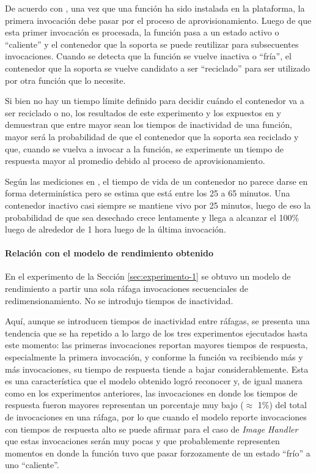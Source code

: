 De acuerdo con \cite{cold-starts-aws-lambda-1}, una vez que una función ha sido instalada en la plataforma, la primera invocación debe pasar por el proceso de aprovisionamiento. Luego de que esta primer invocación es procesada, la función pasa a un estado activo o ``caliente'' y el contenedor que la soporta se puede reutilizar para subsecuentes invocaciones. Cuando se detecta que la función se vuelve inactiva o ``fría'', el contenedor que la soporta se vuelve candidato a ser ``reciclado'' para ser utilizado por otra función que lo necesite.

Si bien no hay un tiempo límite definido para decidir cuándo el contenedor va a ser reciclado o no, los resultados de este experimento y los expuestos en \cite{cold-starts-aws-lambda-1} y \cite{cold-starts-aws-lambda-2} demuestran que entre mayor sean los tiempos de inactividad de una función, mayor será la probabilidad de que el contenedor que la soporta sea reciclado y que, cuando se vuelva a invocar a la función, se experimente un tiempo de respuesta mayor al promedio debido al proceso de aprovisionamiento. 

Según las mediciones en \cite{cold-starts-aws-lambda-1}, el tiempo de vida de un contenedor no parece darse en forma determinística pero se estima que está entre los 25 a 65 minutos. Una contenedor inactivo casi siempre se mantiene vivo por 25 minutos, luego de eso la probabilidad de que sea desechado crece lentamente y llega a alcanzar el 100\% luego de alrededor de 1 hora luego de la última invocación.

\paragraph{Relación con el modelo de rendimiento obtenido} En el experimento de la Sección \ref{sec:experimento-1} se obtuvo un modelo de rendimiento a partir una sola ráfaga invocaciones secuenciales de redimensionamiento. No se introdujo tiempos de inactividad. 

Aquí, aunque se introducen tiempos de inactividad entre ráfagas, se presenta una tendencia que se ha repetido a lo largo de los tres experimentos ejecutados hasta este momento: las primeras invocaciones reportan mayores tiempos de respuesta, especialmente la primera invocación, y conforme la función va recibiendo más y más invocaciones, su tiempo de respuesta tiende a bajar considerablemente. Esta es una característica que el modelo obtenido logró reconocer y, de igual manera como en los experimentos anteriores, las invocaciones en donde los tiempos de respuesta fueron mayores representan un porcentaje muy bajo ($\approx$ 1\%) del total de invocaciones en una ráfaga, por lo que cuando el modelo reporte invocaciones con tiempos de respuesta alto se puede afirmar para el caso de \emph{Image Handler} que estas invocaciones serán muy pocas y que probablemente representen momentos en donde la función tuvo que pasar forzozamente de un estado ``frío'' a uno ``caliente''.


